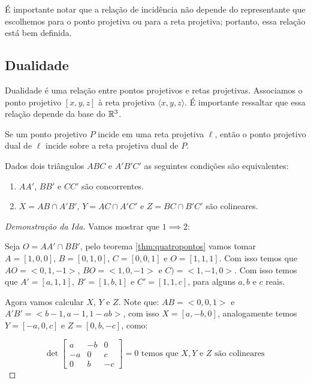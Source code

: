 É importante notar que a relação de incidência não depende do representante que escolhemos para o ponto projetiva ou para a reta projetiva; portanto, essa relação está bem definida.

\subsection{Dualidade}

Dualidade é uma relação entre pontos projetivos e retas projetivas. Associamos o ponto projetivo $[x, y, z]$ à reta projetiva $\langle x, y, z\rangle$. É importante ressaltar que essa relação depende da base do \(\mathbb{R}^3\).

\begin{prop}
    Se um ponto projetivo $P$ incide em uma reta projetiva $\ell$, então o ponto projetivo dual de $\ell$ incide sobre a reta projetiva dual de $P$.
\end{prop}

\begin{thm}
Dados dois triângulos $ABC$ e $A'B'C'$ as seguintes condições são equivalentes:
\begin{enumerate}
    \item $AA'$, $BB'$ e $CC'$ são concorrentes.
    \item $X = AB \cap A'B'$, $Y = AC\cap A'C'$ e $Z = BC \cap B'C'$ são colineares.
\end{enumerate}
\end{thm}

\begin{proof}[Demonstração da Ida]
Vamos mostrar que $1 \implies 2$:

Seja $O = AA' \cap BB'$, pelo teorema \ref{thm:quatropontos} vamos tomar $A = [1, 0, 0]$, $B = [0, 1, 0]$, $C = [0, 0, 1]$ e $O = [1, 1, 1]$. Com isso temos que $AO = < 0, 1, -1>$, $BO = < 1, 0, -1>$ e $C) = < 1, -1, 0>$. Com isso temos que $A' = [a,1,1]$, $B' = [1,b,1]$ e $C'= [1,1,c]$, para alguns $a,b$ e $c$ reais. 

Agora vamos calcular $X$, $Y$ e $Z$. Note que: $AB = <0,0,1>$ e $A'B' = <b-1,a-1,1-ab>$, com isso $X = [a,-b,0]$, analogamente temos $Y = [-a,0,c]$ e $Z = [0,b,-c]$, como:

\[\det \begin{bmatrix} a & -b & 0 \\ -a & 0 & c \\ 0 & b & -c \end{bmatrix} = 0 \text{ temos que } X,Y \text{ e } Z \text{ são colineares } \]
\end{proof}

